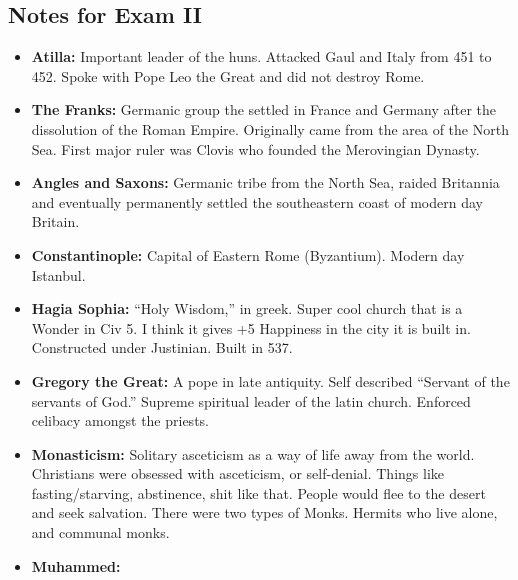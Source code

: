 \documentclass[crop=false,class=book]{standalone}
\begin{document}
        \subsection{Notes for Exam II}
            \begin{itemize}[noitemsep]
                \item \textbf{Atilla:}
                    Important leader of the huns. Attacked Gaul and
                    Italy from 451 to 452. Spoke with Pope Leo the
                    Great and did not destroy Rome.
                \item \textbf{The Franks:}
                    Germanic group the settled in France and Germany
                    after the dissolution of the Roman Empire.
                    Originally came from the area of the North Sea.
                    First major ruler was Clovis who founded the
                    Merovingian Dynasty.
                \item \textbf{Angles and Saxons:}
                    Germanic tribe from the North Sea, raided
                    Britannia and eventually permanently settled
                    the southeastern coast of modern day Britain.
                \item \textbf{Constantinople:}
                    Capital of Eastern Rome (Byzantium).
                    Modern day Istanbul.
                \item \textbf{Hagia Sophia:}
                    ``Holy Wisdom,'' in greek. Super cool church
                    that is a Wonder in Civ 5. I think it gives +5
                    Happiness in the city it is built in.
                    Constructed under Justinian. Built in 537.
                \item \textbf{Gregory the Great:}
                    A pope in late antiquity. Self described
                    ``Servant of the servants of God.'' Supreme
                    spiritual leader of the latin church. Enforced
                    celibacy amongst the priests.
                \item \textbf{Monasticism:}
                    Solitary asceticism as a way of life away from
                    the world. Christians were obsessed with
                    asceticism, or self-denial. Things like
                    fasting/starving, abstinence, shit like that.
                    People would flee to the desert and seek
                    salvation. There were two types of Monks.
                    Hermits who live alone, and communal monks.
                \item \textbf{Muhammed:}

\end{itemize}
\end{document}
